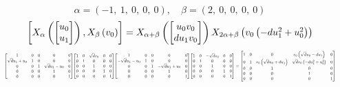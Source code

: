 \documentclass[11pt]{article}
\theoremstyle{definition}
\begin{document}
\[
\alpha = \left( -1, \  1, \  0, \  0, \  0\right), \quad \beta = \left( 2, \  0, \  0, \  0, \  0\right)
\]
\[
\scaletoalign{\textwidth}{\left[ X_{\alpha}\left(\left[\begin{matrix}u_{0}\\u_{1}\end{matrix}\right]\right), X_{\beta}\left(v_{0}\right) \right] = X_{\alpha + \beta}\left(\left[\begin{matrix}u_{0} v_{0}\\d u_{1} v_{0}\end{matrix}\right]\right) X_{2\alpha + \beta}\left(v_{0} \left(- d u_{1}^{2} + u_{0}^{2}\right)\right)}
\]
\[
\scaletoalign{\textwidth}{{\left[\begin{matrix}1 & 0 & 0 & 0 & 0\\\sqrt{d} u_{1} + u_{0} & 1 & 0 & 0 & 0\\0 & 0 & 1 & \sqrt{d} u_{1} - u_{0} & 0\\0 & 0 & 0 & 1 & 0\\0 & 0 & 0 & 0 & 1\end{matrix}\right]} {\left[\begin{matrix}1 & 0 & \sqrt{d} v_{0} & 0 & 0\\0 & 1 & 0 & 0 & 0\\0 & 0 & 1 & 0 & 0\\0 & 0 & 0 & 1 & 0\\0 & 0 & 0 & 0 & 1\end{matrix}\right]} {\left[\begin{matrix}1 & 0 & 0 & 0 & 0\\- \sqrt{d} u_{1} - u_{0} & 1 & 0 & 0 & 0\\0 & 0 & 1 & - \sqrt{d} u_{1} + u_{0} & 0\\0 & 0 & 0 & 1 & 0\\0 & 0 & 0 & 0 & 1\end{matrix}\right]} {\left[\begin{matrix}1 & 0 & - \sqrt{d} v_{0} & 0 & 0\\0 & 1 & 0 & 0 & 0\\0 & 0 & 1 & 0 & 0\\0 & 0 & 0 & 1 & 0\\0 & 0 & 0 & 0 & 1\end{matrix}\right]} = {\left[\begin{matrix}1 & 0 & 0 & v_{0} \left(\sqrt{d} u_{0} - d u_{1}\right) & 0\\0 & 1 & v_{0} \left(\sqrt{d} u_{0} + d u_{1}\right) & \sqrt{d} v_{0} \left(- d u_{1}^{2} + u_{0}^{2}\right) & 0\\0 & 0 & 1 & 0 & 0\\0 & 0 & 0 & 1 & 0\\0 & 0 & 0 & 0 & 1\end{matrix}\right]}}
\]
\end{document}
